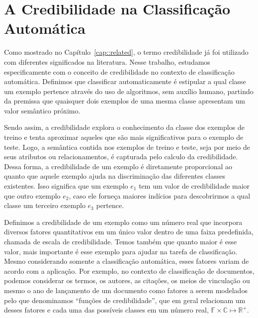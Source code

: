 \chapter{A Credibilidade na Classificação Automática} 
\label{cap::metodo}

Como mostrado no Capítulo~\ref{cap::related}, o termo credibilidade já foi utilizado com diferentes significados na literatura. Nesse trabalho, estudamos especificamente com o conceito de credibilidade no contexto de classificação automática. Definimos que classificar automaticamente é estipular a qual classe um exemplo pertence através do uso de algoritmos, sem auxílio humano, partindo da premissa que quaisquer dois exemplos de uma mesma classe apresentam um valor semântico próximo.   

Sendo assim, a credibilidade explora o conhecimento da classe dos exemplos de treino e tenta aproximar aqueles que são mais significativos para o exemplo de teste.
Logo, a semântica contida nos exemplos de treino e teste, seja por meio de seus atributos ou relacionamentos, é capturada pelo calculo da credibilidade.
Dessa forma, a credibilidade de um exemplo é diretamente proporcional ao quanto que aquele exemplo ajuda na discriminação das diferentes classes existentes.
Isso significa que um exemplo $e_{1}$ tem um valor de credibilidade maior que outro exemplo $e_{2}$, caso ele forneça maiores indícios para descobrirmos a qual classe um terceiro exemplo $e_{3}$ pertence. 

Definimos a credibilidade de um exemplo como um número real que incorpora diversos fatores quantitativos em um único valor dentro de uma faixa predefinida, chamada de escala de credibilidade. Temos também que quanto maior é esse valor, mais importante é esse exemplo para ajudar na tarefa de classificação. Mesmo considerando somente a classificação automática, esses fatores variam de acordo com a aplicação. Por exemplo, no contexto de classificação de documentos, podemos considerar os termos, os autores, as citações, os meios de vinculação ou mesmo o ano de lançamento de um documento como fatores a serem modelados pelo que denominamos ``funções de credibilidade'', que em geral relacionam um desses fatores e cada uma das possíveis classes em um número real, $\mathbb{F} \times \mathbb{C} \mapsto \mathbb{R}^+$. 


